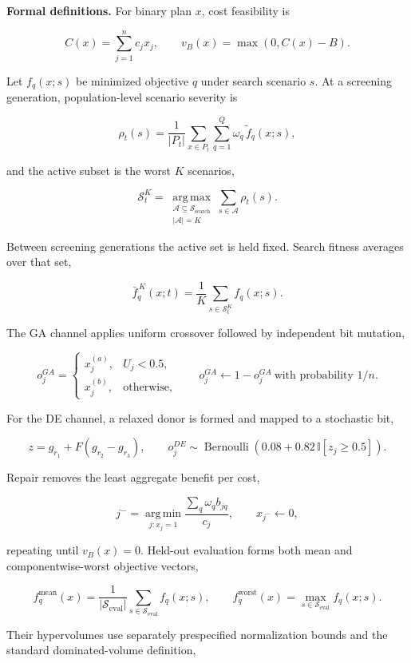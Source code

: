 \documentclass[
  10pt,
  a4paper,
]{article}
\begin{document}
\textbf{Formal definitions.} For binary plan \(x\), cost feasibility is

\[
C(x)=\sum_{j=1}^{n}c_jx_j,\qquad v_B(x)=\max(0,C(x)-B).
\]

Let \(f_q(x;s)\) be minimized objective \(q\) under search scenario
\(s\). At a screening generation, population-level scenario severity is

\[
\rho_t(s)=\frac{1}{|P_t|}\sum_{x\in P_t}
\sum_{q=1}^{Q}\omega_q\,\tilde f_q(x;s),
\]

and the active subset is the worst \(K\) scenarios,

\[
\mathcal S_t^{K}=\operatorname*{arg\,max}_{\substack{\mathcal A\subseteq\mathcal S_{\mathrm{search}}\\|\mathcal A|=K}}
\sum_{s\in\mathcal A}\rho_t(s).
\]

Between screening generations the active set is held fixed. Search
fitness averages over that set,

\[
\bar f_q^{\,K}(x;t)=\frac{1}{K}\sum_{s\in\mathcal S_t^K}f_q(x;s).
\]

The GA channel applies uniform crossover followed by independent bit
mutation,

\[
o_j^{GA}=\begin{cases}x_j^{(a)},&U_j<0.5,\\x_j^{(b)},&\text{otherwise},\end{cases}
\qquad
o_j^{GA}\leftarrow1-o_j^{GA}\ \text{with probability }1/n .
\]

For the DE channel, a relaxed donor is formed and mapped to a stochastic
bit,

\[
z=g_{r_1}+F(g_{r_2}-g_{r_3}),\qquad
o_j^{DE}\sim\operatorname{Bernoulli}\!\left(0.08+0.82\,\mathbb I[z_j\geq0.5]\right).
\]

Repair removes the least aggregate benefit per cost,

\[
j^-=\operatorname*{arg\,min}_{j:x_j=1}
\frac{\sum_q\omega_q b_{jq}}{c_j},\qquad x_{j^-}\leftarrow0,
\]

repeating until \(v_B(x)=0\). Held-out evaluation forms both mean and
componentwise-worst objective vectors,

\[
f_q^{\mathrm{mean}}(x)=\frac{1}{|\mathcal S_{\mathrm{eval}}|}
\sum_{s\in\mathcal S_{\mathrm{eval}}}f_q(x;s),\qquad
f_q^{\mathrm{worst}}(x)=\max_{s\in\mathcal S_{\mathrm{eval}}}f_q(x;s).
\]

Their hypervolumes use separately prespecified normalization bounds and
the standard dominated-volume definition,
\end{document}
